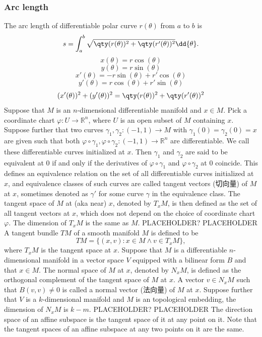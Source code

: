 \subsubsection{Arc length}
The arc length of differentiable polar curve $r(\theta)$ from $a$ to $b$ is
\[s=\int_a^b\sqrt{\qty(r(\theta))^2+\qty(r'(\theta))^2}\dd{\theta}.\]
\bpr
\[x(\theta)=r\cos(\theta)\]
\[y(\theta)=r\sin(\theta)\]
\[x'(\theta)=-r\sin(\theta)+r'\cos(\theta)\]
\[y'(\theta)=r\cos(\theta)+r'\sin(\theta)\]
\[(x'(\theta))^2+(y'(\theta))^2=\qty(r(\theta))^2+\qty(r'(\theta))^2\]
\epr
{}
Suppose that $M$ is an $n$-dimensional differentiable manifold and $x\in M$. Pick a coordinate chart $\varphi\colon U\to\mathbb{R}^n$, where $U$ is an open subset of $M$ containing $x$. Suppose further that two curves $\gamma_1,\gamma_2\colon (-1,1)\to M$ with $\gamma_1(0)=\gamma_2(0)=x$ are given such that both $\varphi\circ\gamma_1,\varphi\circ\gamma_2\colon (-1,1)\to\mathbb{R}^n$ are differentiable. We call these differentiable curves initialized at $x$. Then $\gamma_1$ and $\gamma_2$ are said to be equivalent at $0$ if and only if the derivatives of $\varphi\circ\gamma_1$ and $\varphi\circ\gamma_2$ at $0$ coincide. This defines an equivalence relation on the set of all differentiable curves initialized at $x$, and equivalence classes of such curves are called tangent vectors (切向量) of $M$ at $x$, sometimes denoted as $\gamma'$ for some curve $\gamma$ in the equivalence class. The tangent space of $M$ at (aka near) $x$, denoted by $T_xM$, is then defined as the set of all tangent vectors at $x$, which does not depend on the choice of coordinate chart $\varphi$.
The dimension of $T_xM$ is the same as $M$.
PLACEHOLDER?
\bpr
PLACEHOLDER 
\epr
{}
A tangent bundle $TM$ of a smooth manifold $M$ is defined to be
\[TM=\{(x,v)\colon x\in M\land v\in T_xM\},\]
where $T_xM$ is the tangent space at $x$.
Suppose that $M$ is a differentiable $n$-dimensional manifold in a vector space $V$ equipped with a bilinear form $B$ and that $x\in M$. The normal space of $M$ at $x$, denoted by $N_xM$, is defined as the orthogonal complement of the tangent space of $M$ at $x$. A vector $v\in N_xM$ such that $B(v,v)\neq 0$ is called a normal vector (法向量) of $M$ at $x$.
Suppose further that $V$ is a $k$-dimensional manifold and $M$ is an topological embedding, the dimension of $N_xM$ is $k-m$.
PLACEHOLDER?
\bpr
PLACEHOLDER 
\epr
{}
The direction space of an affine subspace is the tangent space of it at any point on it. Note that the tangent spaces of an affine subspace at any two points on it are the same.
